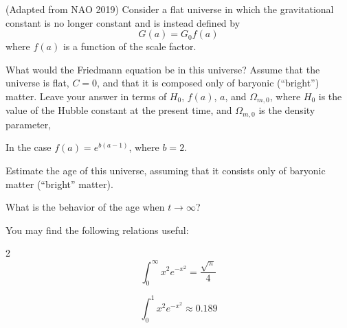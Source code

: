 \documentclass[11pt]{article}
\begin{document}
\begin{pproblem}(Adapted from NAO 2019) 
    Consider a flat universe in which the gravitational constant is no longer constant and is instead defined by
    \[G(a) = G_0 f(a)\]
    where \(f(a)\) is a function of the scale factor.
    \begin{alternativas}
        \item What would the Friedmann equation be in this universe? Assume that the universe is flat, \(C = 0\), and that it is composed only of baryonic (``bright'') matter. Leave your answer in terms of \(H_0\), \(f(a)\), \(a\), and \(\Omega_{m,0}\), where \(H_0\) is the value of the Hubble constant at the present time, and \(\Omega_{m,0}\) is the density parameter,
        
        In the case \(f(a) = e^{b(a-1)}\), where \(b=2\).
        
        \item Estimate the age of this universe, assuming that it consists only of baryonic matter (``bright'' matter).
                
        \item What is the behavior of the age when \(t \rightarrow \infty\)?
    \end{alternativas}

    You may find the following relations useful:
    \begin{paracol}{2}
        \[\int_0^\infty x^2 e^{-x^2} = \frac{\sqrt{\pi}}{4}\]

        \switchcolumn

        \[\int_0^1 x^2 e^{-x^2} \approx 0.189\]
    \end{paracol}
\end{pproblem}
\end{document}
